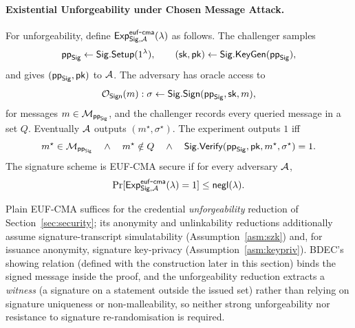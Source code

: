 \begin{definition}
\paragraph{Existential Unforgeability under Chosen Message Attack.}
For unforgeability, define $\mathsf{Exp}^{\mathsf{euf\mbox{-}cma}}_{\mathsf{Sig},\mathcal{A}}(\lambda)$ as follows. The challenger samples
\begin{equation*}
  \mathsf{pp}_{\mathsf{Sig}}\leftarrow\mathsf{Sig}.\mathsf{Setup}(1^\lambda),
  \qquad
  (\mathsf{sk},\mathsf{pk})\leftarrow\mathsf{Sig}.\mathsf{KeyGen}(\mathsf{pp}_{\mathsf{Sig}}),
\end{equation*}
and gives $(\mathsf{pp}_{\mathsf{Sig}},\mathsf{pk})$ to $\mathcal{A}$. The adversary has oracle access to
\begin{equation*}
  \mathcal O_{\mathsf{Sign}}(m):
  \sigma\leftarrow\mathsf{Sig}.\mathsf{Sign}(\mathsf{pp}_{\mathsf{Sig}},\mathsf{sk},m),
\end{equation*}
for messages $m\in\mathcal{M}_{\mathsf{pp}_{\mathsf{Sig}}}$, and the challenger records every queried message in a set $Q$. Eventually $\mathcal{A}$ outputs $(m^\star,\sigma^\star)$. The experiment outputs $1$ iff
\begin{equation*}
  m^\star\in\mathcal{M}_{\mathsf{pp}_{\mathsf{Sig}}}
  \quad\land\quad
  m^\star\notin Q
  \quad\land\quad
  \mathsf{Sig}.\mathsf{Verify}(\mathsf{pp}_{\mathsf{Sig}},\mathsf{pk},m^\star,\sigma^\star)=1.
\end{equation*}
The signature scheme is EUF-CMA secure if for every adversary $\mathcal{A}$,
\begin{equation*}
  \Pr[\mathsf{Exp}^{\mathsf{euf\mbox{-}cma}}_{\mathsf{Sig},\mathcal{A}}(\lambda)=1]\leq \mathsf{negl}(\lambda).
\end{equation*}
\end{definition}

Plain EUF-CMA suffices for the credential \emph{unforgeability} reduction of Section~\ref{sec:security}; its anonymity and unlinkability reductions additionally assume signature-transcript simulatability (Assumption~\ref{asm:szk}) and, for issuance anonymity, signature key-privacy (Assumption~\ref{asm:keypriv}). BDEC's showing relation (defined with the construction later in this section) binds the signed message inside the proof, and the unforgeability reduction extracts a \emph{witness} (a signature on a statement outside the issued set) rather than relying on signature uniqueness or non-malleability, so neither strong unforgeability nor resistance to signature re-randomisation is required.

